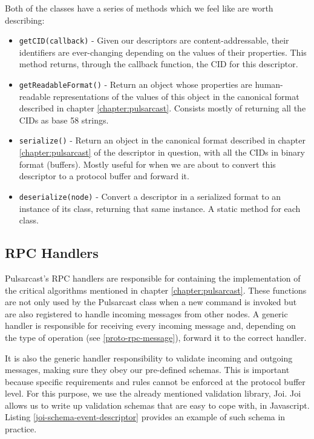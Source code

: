 Both of the classes have a series of methods which we feel like are worth describing:

\begin{itemize}
  \item
    \verb|getCID(callback)| - Given our descriptors are content-addressable, their identifiers are ever-changing depending on the values of their properties. This method returns, through the callback function, the CID for this descriptor.
  \item
    \verb|getReadableFormat()| - Return an object whose properties are human-readable representations of the values of this object in the canonical format described in chapter \ref{chapter:pulsarcast}. Consists mostly of returning all the CIDs as base 58 strings.
  \item
    \verb|serialize()| - Return an object in the canonical format described in chapter \ref{chapter:pulsarcast} of the descriptor in question, with all the CIDs in binary format (buffers). Mostly useful for when we are about to convert this descriptor to a protocol buffer and forward it.
  \item
    \verb|deserialize(node)| - Convert a descriptor in a serialized format to an instance of its class, returning that same instance. A static method for each class.
\end{itemize}


\subsection{RPC Handlers}\label{subsec:rpc-handlers}

Pulsarcast's RPC handlers are responsible for containing the implementation of
the critical algorithms mentioned in chapter \ref{chapter:pulsarcast}. These
functions are not only used by the Pulsarcast class when a new command is
invoked but are also registered to handle incoming messages from other nodes.
A generic handler is responsible for receiving every incoming message and,
depending on the type of operation (see \ref{proto-rpc-message}), forward it to
the correct handler.

It is also the generic handler responsibility to validate incoming and outgoing
messages, making sure they obey our pre-defined schemas. This is important
because specific requirements and rules cannot be enforced at the protocol
buffer level. For this purpose, we use the already mentioned validation
library, Joi. Joi allows us to write up validation schemas that are easy to
cope with, in Javascript. Listing \ref{joi-schema-event-descriptor} provides an
example of such schema in practice.

